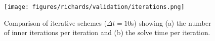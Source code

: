 \begin{figure}[ht]
\begin{center}
\texttt{[image: figures/richards/validation/iterations.png]}
\end{center}
\caption{Comparison of iterative schemes ($\Delta t = 10$s) showing (a) the number of inner iterations per iteration and (b) the solve time per iteration.}
\label{fig:richards-iterations}
\end{figure}

